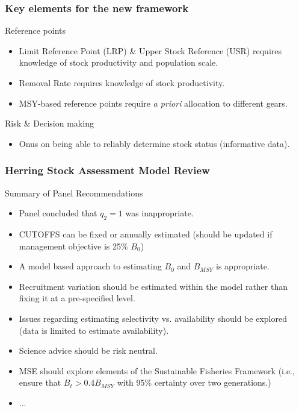%
\begin{frame}[allowframebreaks]
	\frametitle{Key elements for the new framework} 
	\begin{block}
		{Reference points} 
		\begin{itemize}
			\item Limit Reference Point (LRP) \& Upper Stock Reference (USR) requires knowledge of stock productivity and population scale. 
			\item Removal Rate requires knowledge of stock productivity. 
			\item MSY-based reference points require \textit{a priori} allocation to different gears. 
		\end{itemize}
	\end{block}
	\begin{block}
		{Risk \& Decision making} 
		\begin{itemize}
			\item Onus on being able to reliably determine stock status (informative data). 
		\end{itemize}
	\end{block}
\end{frame}

%
\begin{frame}[allowframebreaks]
	\frametitle{Herring Stock Assessment Model Review} 
	\begin{block}
		{Summary of Panel Recommendations} 
		\begin{itemize}
			\item Panel concluded that $q_2=1$ was inappropriate. 
			\item CUTOFFS can be fixed or annually estimated (should be updated if management objective is 25\% $B_0$) 
			\item A model based approach to estimating $B_0$ and $B_{MSY}$ is appropriate. 
			\item Recruitment variation should be estimated within the model rather than fixing it at a pre-specified level. 
			\item Issues regarding estimating selectivity vs. availability should be explored (data is limited to estimate availability). 
			\item Science advice should be risk neutral. 
			\item MSE should explore elements of the Sustainable Fisheries Framework (i.e., ensure that $B_t>0.4B_{MSY}$ with 95\% certainty over two generations.) 
			\item ... 
		\end{itemize}
	\end{block}
\end{frame}




